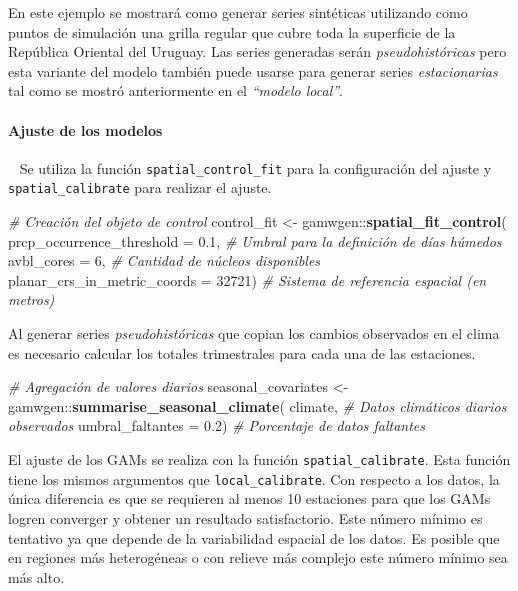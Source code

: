 \documentclass[
  12pt]{article}
\newenvironment{Shaded}{}{}
\newcommand{\CommentTok}[1]{\textcolor[rgb]{0.38,0.63,0.69}{\textit{#1}}}
\newcommand{\DataTypeTok}[1]{\textcolor[rgb]{0.56,0.13,0.00}{#1}}
\newcommand{\DecValTok}[1]{\textcolor[rgb]{0.25,0.63,0.44}{#1}}
\newcommand{\FloatTok}[1]{\textcolor[rgb]{0.25,0.63,0.44}{#1}}
\newcommand{\KeywordTok}[1]{\textcolor[rgb]{0.00,0.44,0.13}{\textbf{#1}}}
\newcommand{\NormalTok}[1]{#1}
\newcommand{\OperatorTok}[1]{\textcolor[rgb]{0.40,0.40,0.40}{#1}}
\newcommand{\StringTok}[1]{\textcolor[rgb]{0.25,0.44,0.63}{#1}}
\begin{document}
En este ejemplo se mostrará como generar series sintéticas utilizando como puntos de simulación una grilla regular que cubre toda la superficie de la República Oriental del Uruguay. Las series generadas serán \emph{pseudohistóricas} pero esta variante del modelo también puede usarse para generar series \emph{estacionarias} tal como se mostró anteriormente en el \emph{``modelo local''}.

\hypertarget{ajuste-de-los-modelos-3}{%
\paragraph{Ajuste de los modelos}\label{ajuste-de-los-modelos-3}}

~
Se utiliza la función \texttt{spatial\_control\_fit} para la configuración del ajuste y \texttt{spatial\_calibrate} para realizar el ajuste.

\begin{Shaded}
\begin{Highlighting}[]
\CommentTok{# Creación del objeto de control}
\NormalTok{control_fit <-}\StringTok{ }\NormalTok{gamwgen}\OperatorTok{::}\KeywordTok{spatial_fit_control}\NormalTok{(}
  \DataTypeTok{prcp_occurrence_threshold =} \FloatTok{0.1}\NormalTok{, }
  \CommentTok{# Umbral para la definición de días húmedos}
  \DataTypeTok{avbl_cores =} \DecValTok{6}\NormalTok{, }
  \CommentTok{# Cantidad de núcleos disponibles}
  \DataTypeTok{planar_crs_in_metric_coords =} \DecValTok{32721}\NormalTok{) }
\CommentTok{# Sistema de referencia espacial (en metros)}
\end{Highlighting}
\end{Shaded}

Al generar series \emph{pseudohistóricas} que copian los cambios observados en el clima es necesario calcular los totales trimestrales para cada una de las estaciones.

\begin{Shaded}
\begin{Highlighting}[]
\CommentTok{# Agregación de valores diarios }
\NormalTok{seasonal_covariates <-}\StringTok{ }\NormalTok{gamwgen}\OperatorTok{::}\KeywordTok{summarise_seasonal_climate}\NormalTok{(}
\NormalTok{  climate,}
  \CommentTok{# Datos climáticos diarios observados}
  \DataTypeTok{umbral_faltantes =} \FloatTok{0.2}\NormalTok{)}
  \CommentTok{# Porcentaje de datos faltantes}
\end{Highlighting}
\end{Shaded}

El ajuste de los GAMs se realiza con la función \texttt{spatial\_calibrate}. Esta función tiene los mismos argumentos que \texttt{local\_calibrate}. Con respecto a los datos, la única diferencia es que se requieren al menos 10 estaciones para que los GAMs logren converger y obtener un resultado satisfactorio. Este número mínimo es tentativo ya que depende de la variabilidad espacial de los datos. Es posible que en regiones más heterogéneas o con relieve más complejo este número mínimo sea más alto.
\end{document}
